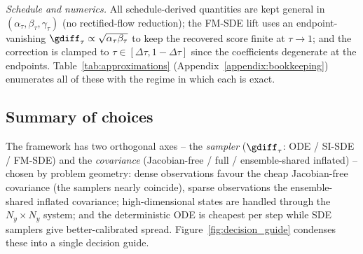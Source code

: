 \emph{Schedule and numerics.} All schedule-derived quantities are kept general in $(\alpha_\tau,\beta_\tau,\gamma_\tau)$ (no rectified-flow reduction); the FM-SDE lift uses an endpoint-vanishing $\gdiff_\tau\propto\sqrt{\alpha_\tau\beta_\tau}$ to keep the recovered score finite at $\tau\to1$; and the correction is clamped to $\tau\in[\Delta\tau,1-\Delta\tau]$ since the coefficients degenerate at the endpoints. Table~\ref{tab:approximations} (Appendix~\ref{appendix:bookkeeping}) enumerates all of these with the regime in which each is exact.

\subsection{Summary of choices}
\label{subsec:summary_choices}

The framework has two orthogonal axes -- the \emph{sampler} ($\gdiff_\tau$: ODE / SI-SDE / FM-SDE) and the \emph{covariance} (Jacobian-free / full / ensemble-shared inflated) -- chosen by problem geometry: dense observations favour the cheap Jacobian-free covariance (the samplers nearly coincide), sparse observations the ensemble-shared inflated covariance; high-dimensional states are handled through the $N_y\times N_y$ system; and the deterministic ODE is cheapest per step while SDE samplers give better-calibrated spread. Figure~\ref{fig:decision_guide} condenses these into a single decision guide.


